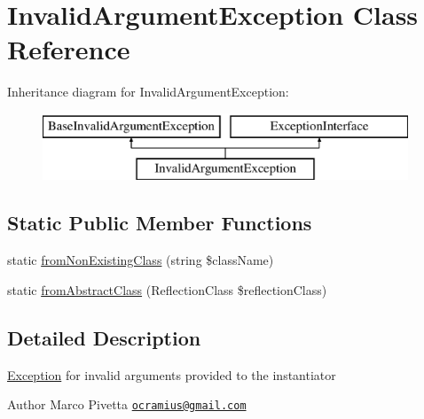 \hypertarget{class_doctrine_1_1_instantiator_1_1_exception_1_1_invalid_argument_exception}{}\section{Invalid\+Argument\+Exception Class Reference}
\label{class_doctrine_1_1_instantiator_1_1_exception_1_1_invalid_argument_exception}
Inheritance diagram for Invalid\+Argument\+Exception\+:\begin{figure}[H]
\begin{center}
\leavevmode
\includegraphics[height=2.000000cm]{class_doctrine_1_1_instantiator_1_1_exception_1_1_invalid_argument_exception}
\end{center}
\end{figure}
\subsection*{Static Public Member Functions}
\begin{DoxyCompactItemize}
\item 
static \mbox{\hyperlink{class_doctrine_1_1_instantiator_1_1_exception_1_1_invalid_argument_exception_a4aee12c522548d82c827b55c3cbde4fe}{from\+Non\+Existing\+Class}} (string \$class\+Name)
\item 
static \mbox{\hyperlink{class_doctrine_1_1_instantiator_1_1_exception_1_1_invalid_argument_exception_ae5f6f9ae65ee23725d4a0c78a7fa70bc}{from\+Abstract\+Class}} (Reflection\+Class \$reflection\+Class)
\end{DoxyCompactItemize}


\subsection{Detailed Description}
\mbox{\hyperlink{namespace_doctrine_1_1_instantiator_1_1_exception}{Exception}} for invalid arguments provided to the instantiator

\begin{DoxyAuthor}{Author}
Marco Pivetta \href{mailto:ocramius@gmail.com}{\tt ocramius@gmail.\+com} 
\end{DoxyAuthor}


